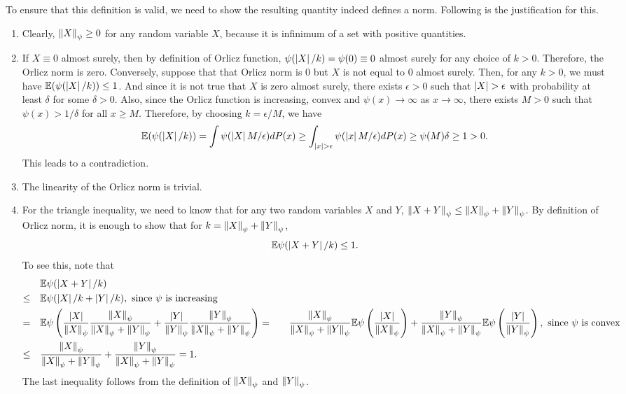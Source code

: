 \documentclass[12pt]{article}
\begin{document}
To ensure that this definition is valid, we need to show the resulting quantity indeed defines a norm. Following is the justification for this.

\begin{enumerate}
    \item Clearly, $\left\Vert X \right\Vert_{\psi} \geq 0$ for any random variable $X$, because it is infinimum of a set with positive quantities.
    \item If $X \equiv 0$ almost surely, then by definition of Orlicz function, $\psi(\left\lvert X \right\rvert/k) = \psi(0) \equiv 0$ almost surely for any choice of $k > 0$. Therefore, the Orlicz norm is zero. Conversely, suppose that that Orlicz norm is $0$ but $X$ is not equal to $0$ almost surely. Then, for any $k > 0$, we must have $\mathbb{E}(\psi(\left\lvert X \right\rvert/k)) \leq 1$. And since it is not true that $X$ is zero almost surely, there exists $\epsilon > 0$ such that $\left\lvert X \right\rvert > \epsilon$ with probability at least $\delta$ for some $\delta > 0$. Also, since the Orlicz function is increasing, convex and $\psi(x) \to \infty$ as $x \to \infty$, there exists $M > 0$ such that $\psi(x) > 1/\delta$ for all $x \geq M$. Therefore, by choosing $k = \epsilon /M$, we have
          \begin{equation*}
              \mathbb{E}(\psi(\left\lvert X \right\rvert/k)) = \int \psi(\left\lvert X \right\rvert M/\epsilon)dP(x) \geq \int_{\left\lvert x \right\rvert > \epsilon} \psi(\left\lvert x \right\rvert M/\epsilon)dP(x) \geq \psi(M)\delta \geq 1 > 0.
          \end{equation*}
          \noindent This leads to a contradiction.
    \item The linearity of the Orlicz norm is trivial.
    \item For the triangle inequality, we need to know that for any two random variables $X$ and $Y$, $\left\Vert X + Y \right\Vert_\psi \leq \left\Vert X \right\Vert_\psi + \left\Vert Y \right\Vert_\psi$. By definition of Orlicz norm, it is enough to show that for $k = \left\Vert X \right\Vert_\psi + \left\Vert Y \right\Vert_\psi$,
          \begin{equation*}
              \mathbb{E}\psi(\left\lvert X + Y \right\rvert/k) \leq 1.
          \end{equation*}
          \noindent To see this, note that
          \begin{align*}
               & \mathbb{E}\psi(\left\lvert X + Y \right\rvert/k) \\
              \leq \quad & \mathbb{E}\psi(\left\lvert X \right\rvert/k + \left\lvert Y \right\rvert/k), \text{ since } \psi \text{ is increasing } \\
              = \quad    & \mathbb{E}\psi\left( \dfrac{\left\lvert X \right\rvert}{\left\Vert X \right\Vert_\psi} \dfrac{\left\Vert X \right\Vert_\psi}{\left\Vert X \right\Vert_\psi + \left\Vert Y \right\Vert_\psi} + \dfrac{\left\lvert Y \right\rvert}{\left\Vert Y \right\Vert_\psi} \dfrac{\left\Vert Y \right\Vert_\psi}{\left\Vert X \right\Vert_\psi + \left\Vert Y \right\Vert_\psi} \right)
              = \quad    & \dfrac{\left\Vert X \right\Vert_\psi}{\left\Vert X \right\Vert_\psi + \left\Vert Y \right\Vert_\psi} \mathbb{E}\psi\left( \dfrac{\left\lvert X \right\rvert}{\left\Vert X \right\Vert_\psi} \right) + \dfrac{\left\Vert Y \right\Vert_\psi}{\left\Vert X \right\Vert_\psi + \left\Vert Y \right\Vert_\psi} \mathbb{E}\psi\left( \dfrac{\left\lvert Y \right\rvert}{\left\Vert Y \right\Vert_\psi} \right), \text{ since } \psi \text{ is convex } \\
              \leq \quad & \dfrac{\left\Vert X \right\Vert_\psi}{\left\Vert X \right\Vert_\psi + \left\Vert Y \right\Vert_\psi} + \dfrac{\left\Vert Y \right\Vert_\psi}{\left\Vert X \right\Vert_\psi + \left\Vert Y \right\Vert_\psi} = 1.
          \end{align*}
          \noindent The last inequality follows from the definition of $\left\Vert X \right\Vert_\psi$ and $\left\Vert Y \right\Vert_\psi$.
\end{enumerate}
\end{document}
